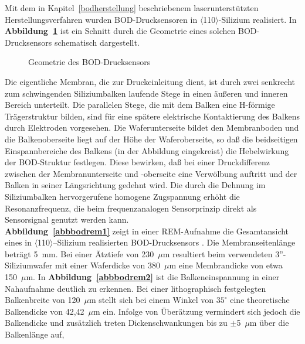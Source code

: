 Mit dem in Kapitel~\ref{bodherstellung} beschriebenem laserunterstützten
Herstellungsverfahren wurden BOD-Drucksensoren in
$\langle$110$\rangle$-Silizium realisiert.
In {\bf Abbildung~\ref{abbbodgeom}} ist ein Schnitt durch die Geometrie
eines solchen BOD-Drucksensors schematisch dargestellt.
\begin{figure}[htb]

\begin{center}

\setabbsn
\end{center}
\caption{\label{abbbodgeom}
 Geometrie des BOD-Drucksensors}
\end{figure}
Die eigentliche Membran, die zur Druckeinleitung dient, ist durch zwei
senkrecht zum schwingenden Siliziumbalken laufende Stege in einen äußeren
und inneren Bereich unterteilt. Die parallelen Stege, die mit dem Balken
eine H-förmige Trägerstruktur bilden, sind für eine spätere elektrische
Kontaktierung des Balkens durch Elektroden vorgesehen. Die Waferunterseite
bildet den Membranboden und die Balkenoberseite liegt auf der Höhe der
Waferoberseite, so daß die beidseitigen Einspannbereiche des Balkens
(in der Abbildung eingekreist) die Hebelwirkung der BOD-Struktur
festlegen. Diese bewirken, daß bei einer Druckdifferenz zwischen der
Membranunterseite und -oberseite eine Verwölbung auftritt und der Balken
in seiner Längsrichtung gedehnt wird. Die durch die Dehnung im Siliziumbalken
hervorgerufene homogene Zugspannung erhöht die Resonanzfrequenz,
die beim frequenzanalogen Sensorprinzip direkt als Sensorsignal genutzt
werden kann.\\
%
{\bf Abbildung~\ref{abbbodrem1}} zeigt in einer REM-Aufnahme die
Gesamtansicht eines in $\langle$110$\rangle$--Silizium realisierten
BOD-Drucksensors \cite{Sch93b}. Die Membranseitenlänge beträgt
5~mm. Bei einer Ätztiefe von 230~$\mu$m resultiert beim
verwendeten 3''-Siliziumwafer mit
einer Waferdicke von 380~$\mu$m eine Membrandicke von etwa 150~$\mu$m.
In {\bf Abbildung~\ref{abbbodrem2}} ist die Balkeneinspannung in einer
Nahaufnahme deutlich zu erkennen. Bei einer lithographisch festgelegten
Balkenbreite von 120~$\mu$m stellt sich bei einem Winkel von $35^{\circ}$
eine theoretische Balkendicke von 42,42~$\mu$m ein. Infolge von Überätzung
vermindert sich jedoch die Balkendicke und zusätzlich treten
Dickenschwankungen bis zu $\pm$5~$\mu$m über die Balkenlänge auf,

